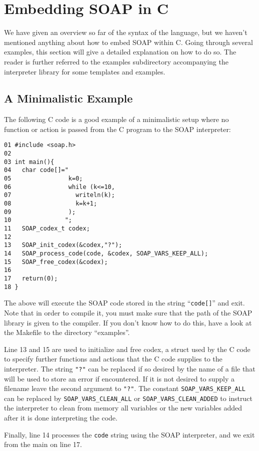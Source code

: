 \documentclass{warpdoc}
\begin{document}
\section{Embedding SOAP in C}

We have given an overview so far of the syntax of the language,
but we haven't mentioned anything about how to embed SOAP within C.
Going through several examples,
this section will give a detailed explanation on how to do so.
The reader is further referred to the examples subdirectory accompanying
the interpreter library for some templates and examples.


\subsection{A Minimalistic Example}

The following C code is a good example of a minimalistic setup
where no function or action is passed from the C program to
the SOAP interpreter:
%
\begin{verbatim}
01 #include <soap.h>
02
03 int main(){
04   char code[]="
05                k=0;
06                while (k<=10,
07                  writeln(k);
08                  k=k+1;
09                );
10               ";
11   SOAP_codex_t codex;
12
13   SOAP_init_codex(&codex,"?");
14   SOAP_process_code(code, &codex, SOAP_VARS_KEEP_ALL);
15   SOAP_free_codex(&codex);
16
17   return(0);
18 }
\end{verbatim}
%
The above will execute the SOAP code stored in the string ``\verb|code[]|''
and exit. Note that in order to compile it, you must make sure that
the path of the SOAP library is given to the compiler. If you
don't know how to do this, have a look at the Makefile to the directory ``examples''.

Line 13 and 15 are used to initialize and free codex, a struct used by
the C code to specify further functions and actions
that the C code  supplies to the interpreter. The string \verb|"?"| can be replaced if so desired by 
the name of a file that will be used to store an error if encountered. If it is
not desired to supply a filename leave the second argument to \verb|"?"|. The constant \verb|SOAP_VARS_KEEP_ALL|
can be replaced by \verb|SOAP_VARS_CLEAN_ALL| or \verb|SOAP_VARS_CLEAN_ADDED| to instruct the interpreter to
clean from memory all variables or the new variables added after it is done interpreting the
code.

Finally, line 14 processes the \verb|code| string using the SOAP interpreter,
and we exit from the main on line 17.
\end{document}
